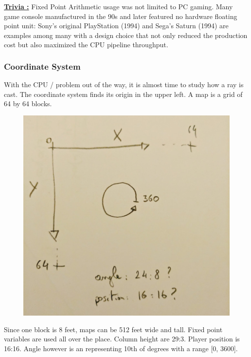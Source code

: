  \textbf{\underline{Trivia :}}  Fixed Point Arithmetic usage was not limited to PC gaming. Many game console manufactured in the 90s and later featured no hardware floating point unit: Sony's original PlayStation (1994) and Sega's Saturn (1994) are examples among many with a design choice that not only reduced the production cost but also maximized the CPU pipeline throughput.
 

 
 


\subsubsection{Coordinate System}
With the CPU / problem out of the way, it is almost time to study how a ray is cast. The coordinate system finds its origin in the upper left. A map is a grid of 64 by 64 blocks. 
\begin{figure}[H]
  \centering
 \includegraphics[width=.5\textwidth]{imgs/drawings/coordinate_system.png}
\end{figure}
\par
Since one block is 8 feet, maps can be 512 feet wide and tall. Fixed point variables are used all over the place. Column height are 29:3. Player position is 16:16. Angle however is an  representing 10th of degrees with a range [0, 3600].

















